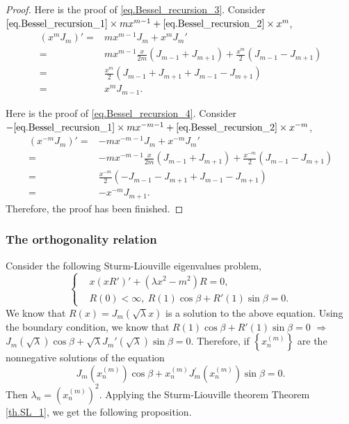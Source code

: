 \begin{proof}
Here is the proof of \eqref{eq.Bessel_recursion_3}. Consider $\eqref{eq.Bessel_recursion_1}\times mx^{m-1} + \eqref{eq.Bessel_recursion_2}\times x^m$,
\begin{equation}\label{eq.proof_Bessel_recursion_4}
\begin{split}
( x^m J_m )' =& m x^{m-1} J_m + x^m J_m'
\\
=& m x^{m-1} \frac{x}{2m} ( J_{m-1} + J_{m+1} ) + \frac{x^m}{2} ( J_{m-1} - J_{m+1} )
\\
=& \frac{x^m}{2} (J_{m-1} + J_{m+1} + J_{m-1} - J_{m+1})
\\
=& x^m J_{m-1}.
\end{split}
\end{equation}

Here is the proof of \eqref{eq.Bessel_recursion_4}. Consider $-\eqref{eq.Bessel_recursion_1}\times mx^{-m-1} + \eqref{eq.Bessel_recursion_2}\times x^{-m}$,
\begin{equation}\label{eq.proof_Bessel_recursion_5}
\begin{split}
(x^{-m} J_m)' =& -m x^{-m-1} J_m + x^{-m} J_m' 
\\
=& -m x^{-m-1} \frac{x}{2m} ( J_{m-1} + J_{m+1} ) + \frac{x^{-m}}{2} ( J_{m-1} - J_{m+1} )
\\
=& \frac{x^{-m}}{2} (-J_{m-1} - J_{m+1} + J_{m-1} - J_{m+1} )
\\
=& - x^{-m} J_{m+1}.
\end{split}
\end{equation}
Therefore, the proof has been finished.
\end{proof}

\subsubsection{The orthogonality relation}
Consider the following Sturm-Liouville eigenvalues problem,
\begin{equation}\label{eq.Bessel_SL_problem}
\left\{
\begin{aligned}
    &x(x R')' + (\lambda x^2 - m^2)R = 0,
    \\
    &R(0) < \infty,\ R(1)\cos\beta + R'(1)\sin\beta = 0.
\end{aligned}
\right.
\end{equation}
We know that $R(x) = J_m(\sqrt{\lambda}x)$ is a solution to the above equation. Using the boundary condition, we know that $R(1)\cos\beta + R'(1)\sin\beta = 0$ $\Rightarrow$ $J_m(\sqrt{\lambda})\cos\beta + \sqrt{\lambda}J_m'(\sqrt{\lambda})\sin\beta = 0$. Therefore, if $\left\{x_n^{(m)}\right\}$ are the nonnegative solutions of the equation
\begin{equation}
    J_m\left(x_n^{(m)}\right) \cos \beta+x_n^{(m)} J_m^{\prime}\left(x_n^{(m)}\right) \sin \beta=0.
\end{equation}
Then $\lambda_n = \left(x_n^{(m)}\right)^2$. Applying the Sturm-Liouville theorem Theorem \ref{th.SL_1}, we get the following proposition.

